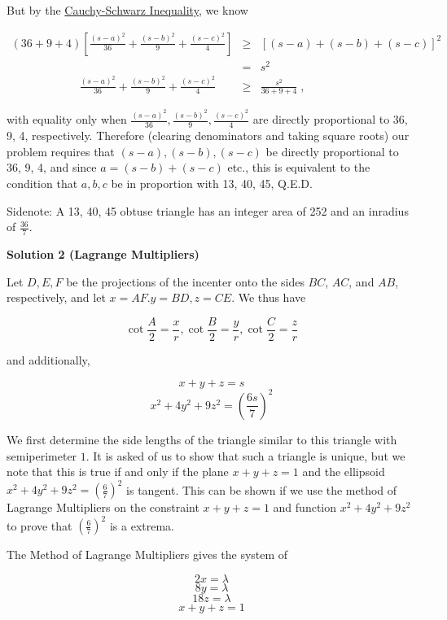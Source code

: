 \begin{enumerate}
 But by the \href{https://artofproblemsolving.com/wiki/index.php?title=Cauchy-Schwarz\_Inequality}{Cauchy-Schwarz Inequality}, we know

 $\begin{matrix} (36 + 9 + 4) \left[ \frac{(s-a)^2}{36} + \frac{(s-b)^2}{9} + \frac{(s-c)^2}{4} \right] & \ge &\left[ (s-a) + (s-b) + (s-c) \right]^2\\ & = & s^2 \\ \qquad\qquad \quad \quad \frac{(s-a)^2}{36} + \frac{(s-b)^2}{9} + \frac{(s-c)^2}{4} & \ge &\frac{s^2}{36 + 9 + 4} \; , \end{matrix}$

 

 with equality only when $\frac{(s-a)^2}{36}, \frac{(s-b)^2}{9}, \frac{(s-c)^2}{4}$ are directly proportional to 36, 9, 4, respectively.  Therefore (clearing denominators and taking square roots) our problem requires that $(s-a), (s-b), (s-c)$ be directly proportional to 36, 9, 4, and since $a = (s-b) + (s-c)$ etc., this is equivalent to the condition that $a,b,c$ be in proportion with 13, 40, 45, Q.E.D.

 Sidenote: A 13, 40, 45 obtuse triangle has an integer area of 252 and an inradius of $\frac{36}{7}$.

 



\textbf{Solution 2 (Lagrange Multipliers)}

Let $D, E, F$ be the projections of the incenter onto the sides $BC$, $AC$, and $AB$, respectively, and let $x=AF . y=BD, z=CE$. We thus have

 
 \[\cot \frac{A}{2} = \frac{x}{r} , \cot \frac{B}{2} = \frac{y}{r} , \cot \frac{C}{2} = \frac{z}{r}\]

 and additionally, 

 
 \[x+y+z = s\]
 \[x^2 + 4 y^2 + 9 z^2 = (\frac{6s}{7})^2\]

 We first determine the side lengths of the triangle similar to this triangle with semiperimeter $1$. It is asked of us to show that such a triangle is unique, but we note that this is true if and only if the plane $x+y+z=1$ and the ellipsoid $x^2 + 4 y^2 + 9 z^2 = (\frac{6}{7})^2$ is tangent. This can be shown if we use the method of Lagrange Multipliers on the constraint $x+y+z=1$ and function $x^2 + 4 y^2 + 9 z^2$ to prove that $(\frac{6}{7})^2$ is a extrema.

 The Method of Lagrange Multipliers gives the system of 

 
 \[2x= \lambda\]
 \[8y= \lambda\]
 \[18z= \lambda\]
 \[x+y+z=1\]


\end{enumerate}
